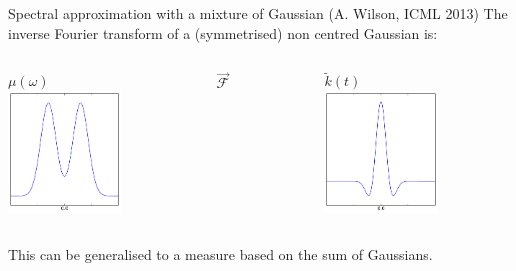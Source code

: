 \begin{frame}{Spectral approximation with a mixture of Gaussian (A. Wilson, ICML 2013)}
The inverse Fourier transform of a (symmetrised) non centred Gaussian is:
\begin{columns}[c]
\begin{column}{5cm}
\begin{center}
$\mu(\omega)$ \\
\includegraphics[width=3cm]{3_gaussian_process_regression/figures/python/Bochner-wilsonmu}
\end{center}
\end{column}
\begin{column}{2cm}
\begin{center}
$\stackrel{\longrightarrow}{\mathcal{F}}$
\end{center}
\end{column}
\begin{column}{5cm}
\begin{center}
$\tilde{k}(t)$\\
\includegraphics[width=3cm]{3_gaussian_process_regression/figures/python/Bochner-wilsonk}
\end{center}
\end{column}
\end{columns}
\vspace{3mm}
This can be generalised to a measure based on the sum of Gaussians.

\end{frame}

